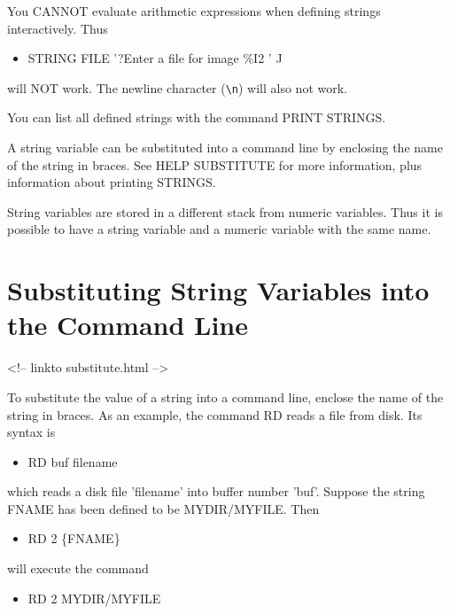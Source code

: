 You CANNOT evaluate arithmetic expressions when defining strings
interactively.  Thus
\begin{itemize}
  \item{STRING FILE '?Enter a file for image \%I2 ' J}
\end{itemize}
will NOT work. The newline character (\verb+\n+) will also not work.

You can list all defined strings with the command PRINT STRINGS.

A string variable can be substituted into a command line by enclosing the
name of the string in braces.  See HELP SUBSTITUTE for more information,
plus information about printing STRINGS.

String variables are stored in a different stack from numeric variables.
Thus it is possible to have a string variable and a numeric variable with
the same name.

\section{Substituting String Variables into the Command Line}
\begin{rawhtml}
<!-- linkto substitute.html -->
\end{rawhtml}


To substitute the value of a string into a command line, enclose the name
of the string in braces.  As an example, the command RD reads a file from
disk.  Its syntax is
\begin{itemize}
  \item{RD buf filename}
\end{itemize}
which reads a disk file 'filename' into buffer number 'buf'.  Suppose the
string FNAME has been defined to be MYDIR/MYFILE.  Then
\begin{itemize}
  \item{RD 2 \{FNAME\}}
\end{itemize}
will execute the command
\begin{itemize}
  \item{RD 2 MYDIR/MYFILE}
\end{itemize}

